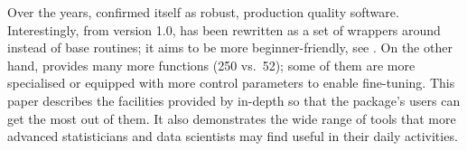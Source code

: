 \documentclass[nojss]{jss}
\begin{document}
Over the years, 
confirmed itself as robust,  production quality software.
Interestingly, from version 1.0,  has been rewritten as a
set of wrappers around  instead of base  routines;
it aims to be more beginner-friendly, see \cite[Chapter~14]{GrolemundWickham2017:rdatascience}.
On the other hand,  provides many more
functions (250 vs.~52); some of them are
more specialised or equipped with more control parameters
to enable fine-tuning.
This paper describes the facilities
provided by  in-depth so that the package's users
can get the most out of them. It also demonstrates the wide range
of tools that more advanced statisticians and data scientists may find
useful in their daily activities.














%
%
%
%
%
%





%
%
\end{document}

